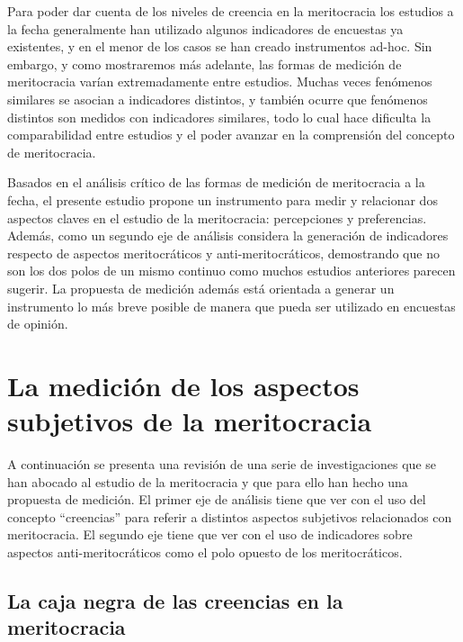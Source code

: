 \documentclass[
]{article}
\begin{document}
Para poder dar cuenta de los niveles de creencia en la meritocracia los
estudios a la fecha generalmente han utilizado algunos indicadores de
encuestas ya existentes, y en el menor de los casos se han creado
instrumentos ad-hoc. Sin embargo, y como mostraremos más adelante, las
formas de medición de meritocracia varían extremadamente entre estudios.
Muchas veces fenómenos similares se asocian a indicadores distintos, y
también ocurre que fenómenos distintos son medidos con indicadores
similares, todo lo cual hace dificulta la comparabilidad entre estudios
y el poder avanzar en la comprensión del concepto de meritocracia.

Basados en el análisis crítico de las formas de medición de meritocracia
a la fecha, el presente estudio propone un instrumento para medir y
relacionar dos aspectos claves en el estudio de la meritocracia:
percepciones y preferencias. Además, como un segundo eje de análisis
considera la generación de indicadores respecto de aspectos
meritocráticos y anti-meritocráticos, demostrando que no son los dos
polos de un mismo continuo como muchos estudios anteriores parecen
sugerir. La propuesta de medición además está orientada a generar un
instrumento lo más breve posible de manera que pueda ser utilizado en
encuestas de opinión.

\hypertarget{la-mediciuxf3n-de-los-aspectos-subjetivos-de-la-meritocracia}{%
\section{La medición de los aspectos subjetivos de la
meritocracia}\label{la-mediciuxf3n-de-los-aspectos-subjetivos-de-la-meritocracia}}

A continuación se presenta una revisión de una serie de investigaciones
que se han abocado al estudio de la meritocracia y que para ello han
hecho una propuesta de medición. El primer eje de análisis tiene que ver
con el uso del concepto ``creencias'' para referir a distintos aspectos
subjetivos relacionados con meritocracia. El segundo eje tiene que ver
con el uso de indicadores sobre aspectos anti-meritocráticos como el
polo opuesto de los meritocráticos.

\hypertarget{la-caja-negra-de-las-creencias-en-la-meritocracia}{%
\subsection{La caja negra de las creencias en la
meritocracia}\label{la-caja-negra-de-las-creencias-en-la-meritocracia}}
\end{document}
